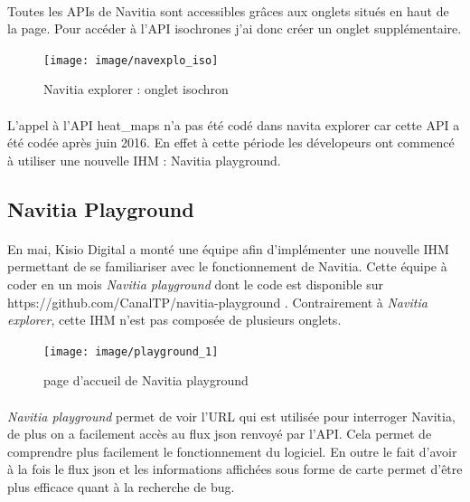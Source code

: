 \documentclass[a4paper]{report}
\begin{document}
\paragraph{} Toutes les APIs de Navitia sont accessibles grâces aux onglets situés en haut de la page. Pour accéder à l'API isochrones j'ai donc créer un onglet supplémentaire.

\begin{figure}[H]
	\begin{center}
		\texttt{[image: image/navexplo\_iso]}
		\caption{Navitia explorer : onglet isochron}
		\label{Navitia explorer : onglet isochron}
	\end{center}
\end{figure}

\paragraph{} L'appel à l'API heat\_maps n'a pas été codé dans navita explorer car cette API a été codée après juin 2016. En effet à cette période les dévelopeurs ont commencé à utiliser une nouvelle IHM : Navitia playground.


\subsection{Navitia Playground}

\paragraph{} En mai, Kisio Digital a monté une équipe afin d'implémenter une nouvelle IHM permettant de se familiariser avec le fonctionnement de Navitia. Cette équipe à coder en un mois \emph{Navitia playground} dont le code est disponible sur \color{blue} https://github.com/CanalTP/navitia-playground \color{black}. Contrairement à \emph{Navitia explorer}, cette IHM n'est pas composée de plusieurs onglets. 

\begin{figure}[H]
	\begin{center}
		\texttt{[image: image/playground\_1]}
		\caption{page d'accueil de Navitia playground}
		\label{page d'accueil de Navitia playground}
	\end{center}
\end{figure}

\paragraph{} \emph{Navitia playground} permet de voir l'URL qui est utilisée pour interroger Navitia, de plus on a facilement accès au flux json renvoyé par l'API. Cela permet de comprendre plus facilement le fonctionnement du logiciel. En outre le fait d'avoir à la fois le flux json et les informations affichées sous forme de carte permet d'être plus efficace quant à la recherche de bug.
\end{document}
